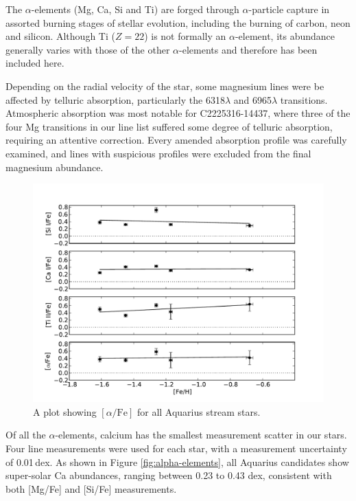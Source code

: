 \documentclass{emulateapj}
\begin{document}
The $\alpha$-elements (Mg, Ca, Si and Ti) are forged through $\alpha$-particle capture in assorted burning stages of stellar evolution, including the burning of carbon, neon and silicon. Although Ti ($Z = 22$) is not formally an $\alpha$-element, its abundance generally varies with those of the other $\alpha$-elements and therefore has been included here.

Depending on the radial velocity of the star, some magnesium lines were be affected by telluric absorption, particularly the 6318$\lambda$ and 6965$\lambda$ transitions. Atmospheric absorption was most notable for C2225316-14437, where three of the four Mg transitions in our line list suffered some degree of telluric absorption, requiring an attentive correction. Every amended absorption profile was carefully examined, and lines with suspicious profiles were excluded from the final magnesium abundance.

\begin{figure}[h]
	\includegraphics[width=\columnwidth]{./figures/aquarius-alpha-fe.pdf}
	\caption{A plot showing $[\alpha/\mbox{Fe}]$ for all Aquarius stream stars.}
	\label{fig:alpha-fe}
\end{figure}

Of all the $\alpha$-elements, calcium has the smallest measurement scatter in our stars. Four line measurements were used for each star, with a measurement uncertainty of 0.01\,dex. As shown in Figure \ref{fig:alpha-elements}, all Aquarius candidates show super-solar Ca abundances, ranging between 0.23 to 0.43 dex, consistent with both [Mg/Fe] and [Si/Fe] measurements. 
\end{document}
